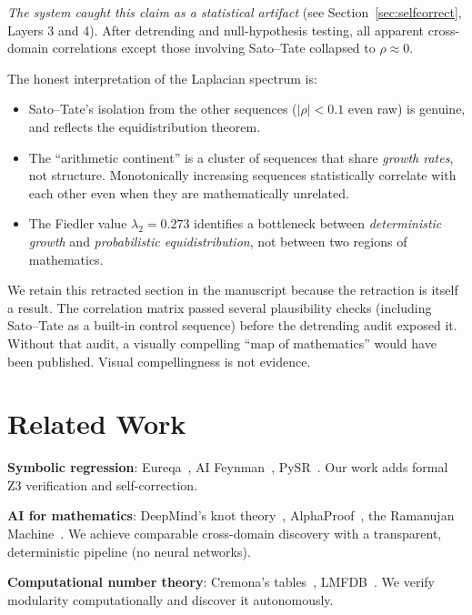\documentclass[11pt,a4paper]{article}
\begin{document}
\emph{The system caught this claim as a statistical artifact} (see
Section~\ref{sec:selfcorrect}, Layers 3 and 4). After detrending and
null-hypothesis testing, all apparent cross-domain correlations except
those involving Sato--Tate collapsed to $\rho \approx 0$.

The honest interpretation of the Laplacian spectrum is:
\begin{itemize}
  \item Sato--Tate's isolation from the other sequences
    ($|\rho| < 0.1$ even raw) is genuine, and reflects the
    equidistribution theorem.
  \item The ``arithmetic continent'' is a cluster of sequences that
    share \emph{growth rates}, not structure. Monotonically increasing
    sequences statistically correlate with each other even when they
    are mathematically unrelated.
  \item The Fiedler value $\lambda_2 = 0.273$ identifies a bottleneck
    between \emph{deterministic growth} and \emph{probabilistic
    equidistribution}, not between two regions of mathematics.
\end{itemize}

We retain this retracted section in the manuscript because the
retraction is itself a result. The correlation matrix passed several
plausibility checks (including Sato--Tate as a built-in control
sequence) before the detrending audit exposed it. Without that audit,
a visually compelling ``map of mathematics'' would have been published.
Visual compellingness is not evidence.


\section{Related Work}
\label{sec:related}

\textbf{Symbolic regression}: Eureqa~\citep{schmidt2009},
AI Feynman~\citep{udrescu2020}, PySR~\citep{cranmer2023}.
Our work adds formal Z3 verification and self-correction.

\textbf{AI for mathematics}: DeepMind's knot theory~\citep{davies2021},
AlphaProof~\citep{deepmind2024}, the Ramanujan
Machine~\citep{raayoni2021}. We achieve comparable cross-domain discovery
with a transparent, deterministic pipeline (no neural networks).

\textbf{Computational number theory}: Cremona's
tables~\citep{cremona1997}, LMFDB~\citep{lmfdb2024}. We verify
modularity computationally and discover it autonomously.
\end{document}
